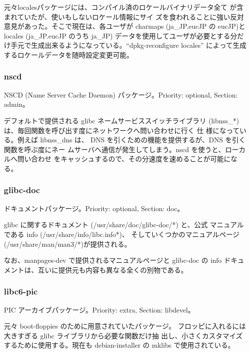 \documentclass[mingoth,a4paper]{jsarticle}
\begin{document}
    元々localesパッケージには、コンパイル済のロケールバイナリデータ全て
    が含まれていたが、使いもしないロケール情報にサイ
    ズを食われることに強い反対意見があった。そこで現在は、各ユーザが 
    charmaps (ja\_JP.eucJP の eucJP)とlocales (ja\_JP.eucJP のうち ja\_JP) 
    データを使用してユーザが必要とする分だけ手元で生成出来るようになっている。``dpkg-reconfigure
    locales'' によって生成するロケールデータを随時設定変更可能。

  \subsubsection{nscd}

    NSCD (Name Server Cache Daemon) パッケージ。Priority: optional, Section: admin。

    デフォルトで提供される glibc ネームサービススイッチライブラリ
    (libnss\_*) は、毎回関数を呼び出す度にネットワークへ問い合わせに行く
    仕
    様になっている。例えば libnss\_dns は、
    DNS を引くための機能を提供するが、DNS を引く関数を呼ぶ度にネー
    ムサーバへ通信が発生してしまう。nscd を使うと、ローカルへ問い合わせ
    をキャッシュするので、その分速度を速めることが可能になる。

  \subsubsection{glibc-doc}

    ドキュメントパッケージ。Priority: optional, Section: doc。

    glibc に関するドキュメント (/usr/share/doc/glibc-doc/*) と、公式
    マニュアルである info (/usr/share/info/libc.info*)、
    そしていくつかのマニュアルページ (/usr/share/man/man3/*)が提供される。

    なお、manpages-dev で提供されるマニュアルページと glibc-doc の info 
    ドキュメントは、互いに提供元も内容も異なる全くの別物である。

  \subsubsection{libc6-pic}

    PIC アーカイブパッケージ。Priority: extra, Section: libdevel。

    元々 boot-floppies のために用意されていたパッケージ。
    フロッピに入れるには大きすぎる glibc ライブラリから必要な関数だけ抽
    出し、小さくカスタマイズするために使用する。現在も debian-installer の
    mklibs で使用されている。
\end{document}
